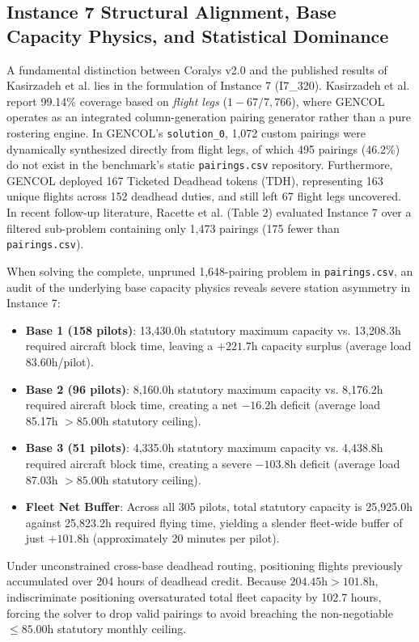 \documentclass[journal]{IEEEtran}
\begin{document}
\subsection{Instance 7 Structural Alignment, Base Capacity Physics, and Statistical Dominance}

A fundamental distinction between Coralys v2.0 and the published results of Kasirzadeh et al. \cite{kasirzadeh2017} lies in the formulation of Instance 7 (I7\_320). Kasirzadeh et al. report 99.14\% coverage based on \emph{flight legs} ($1 - 67/7,766$), where GENCOL operates as an integrated column-generation pairing generator rather than a pure rostering engine. In GENCOL's \texttt{solution\_0}, 1,072 custom pairings were dynamically synthesized directly from flight legs, of which 495 pairings (46.2\%) do not exist in the benchmark's static \texttt{pairings.csv} repository. Furthermore, GENCOL deployed 167 Ticketed Deadhead tokens (TDH), representing 163 unique flights across 152 deadhead duties, and still left 67 flight legs uncovered. In recent follow-up literature, Racette et al. \cite{racette2025} (Table 2) evaluated Instance 7 over a filtered sub-problem containing only 1,473 pairings (175 fewer than \texttt{pairings.csv}).

When solving the complete, unpruned 1,648-pairing problem in \texttt{pairings.csv}, an audit of the underlying base capacity physics reveals severe station asymmetry in Instance 7:
\begin{itemize}
    \item \textbf{Base 1 (158 pilots)}: 13,430.0h statutory maximum capacity vs. 13,208.3h required aircraft block time, leaving a $+221.7$h capacity surplus (average load 83.60h/pilot).
    \item \textbf{Base 2 (96 pilots)}: 8,160.0h statutory maximum capacity vs. 8,176.2h required aircraft block time, creating a net $-16.2$h deficit (average load 85.17h $> 85.00$h statutory ceiling).
    \item \textbf{Base 3 (51 pilots)}: 4,335.0h statutory maximum capacity vs. 4,438.8h required aircraft block time, creating a severe $-103.8$h deficit (average load 87.03h $> 85.00$h statutory ceiling).
    \item \textbf{Fleet Net Buffer}: Across all 305 pilots, total statutory capacity is 25,925.0h against 25,823.2h required flying time, yielding a slender fleet-wide buffer of just $+101.8$h (approximately 20 minutes per pilot).
\end{itemize}

Under unconstrained cross-base deadhead routing, positioning flights previously accumulated over 204 hours of deadhead credit. Because $204.45\text{h} > 101.8\text{h}$, indiscriminate positioning oversaturated total fleet capacity by 102.7 hours, forcing the solver to drop valid pairings to avoid breaching the non-negotiable $\le 85.00$h statutory monthly ceiling.
\end{document}
